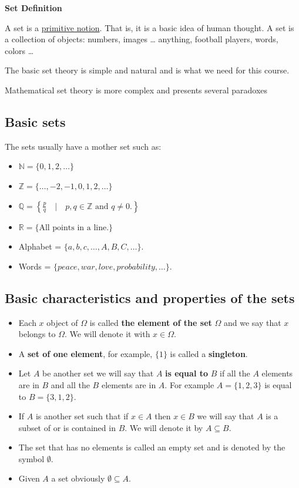 \documentclass[
]{book}
\providecommand{\tightlist}{%
  \setlength{\itemsep}{0pt}\setlength{\parskip}{0pt}}
\theoremstyle{definition}
\theoremstyle{definition}
\theoremstyle{definition}
\theoremstyle{definition}
\theoremstyle{remark}
\begin{document}
\textbf{Set Definition}

A set is a \href{https://en.wikipedia.org/wiki/Primitive_notion}{primitive notion}. That is, it is a basic idea of human thought. A set is a collection of objects: numbers, images \ldots{} anything, football players, words, colors \ldots{}

The basic set theory is simple and natural and is what we need for this course.

Mathematical set theory is more complex and presents several paradoxes

\hypertarget{basic-sets}{%
\subsection{Basic sets}\label{basic-sets}}

The sets usually have a mother set such as:

\begin{itemize}
\tightlist
\item
  \(\mathbb{N}=\{0,1,2,\ldots\}\)
\item
  \(\mathbb{Z}=\{\ldots,-2,-1,0,1,2,\ldots\}\)
\item
  \(\mathbb{Q}=\left\{\frac{p}{q}\quad\Big|\quad p,q\in \mathbb{Z} \mbox{ and } q \not= 0.\right\}\)
\item
  \(\mathbb{R}=\{\mbox{All points in a line.}\}\)
\item
  Alphabet = \(\{a,b,c,\ldots, A,B,C,\ldots\}.\)
\item
  Words = \(\{peace, war, love, probability,\ldots\}.\)
\end{itemize}

\hypertarget{basic-characteristics-and-properties-of-the-sets}{%
\subsection{Basic characteristics and properties of the sets}\label{basic-characteristics-and-properties-of-the-sets}}

\begin{itemize}
\tightlist
\item
  Each \(x\) object of \(\Omega\) is called \textbf{the element of the set} \(\Omega\) and we say that \(x\) belongs to \(\Omega\). We will denote it with \(x\in \Omega\).
\item
  A \textbf{set of one element}, for example, \(\{1\}\) is called a \textbf{singleton}.
\item
  Let \(A\) be another set we will say that \(A\) \textbf{is equal to} \(B\) if all the \(A\) elements are in \(B\) and all the \(B\) elements are in \(A\). For example \(A=\{1,2,3\}\) is equal to \(B=\{3,1,2\}\).
\item
  If \(A\) is another set such that if \(x\in A\) then \(x\in B\) we will say that \(A\) is a subset of or is contained in \(B\). We will denote it by \(A\subseteq B.\)
\item
  The set that has no elements is called an empty set and is denoted by the symbol \(\emptyset\).
\item
  Given \(A\) a set obviously \(\emptyset\subseteq A.\)
\end{itemize}
\end{document}
